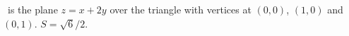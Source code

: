 {\surfaceS\ is the plane $z=x+2y$ over the triangle with vertices at $(0,0)$, $(1,0)$ and $(0,1)$.
}
{$S = \sqrt{6}/2$.
}
